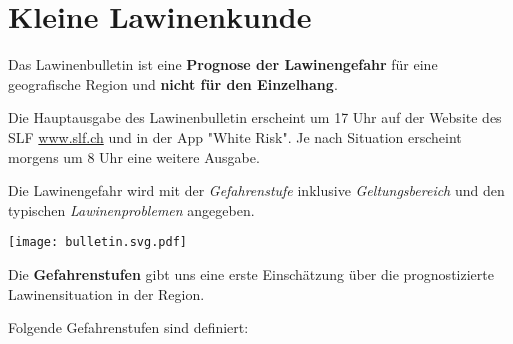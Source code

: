 \section{Kleine Lawinenkunde}

Das Lawinenbulletin ist eine \textbf{Prognose der Lawinengefahr} für eine geografische Region und \textbf{nicht für den Einzelhang}.

Die Hauptausgabe des Lawinenbulletin erscheint um 17 Uhr auf der Website des SLF \href{https://www.slf.ch}{www.slf.ch} und in der App "White Risk".
Je nach Situation erscheint morgens um 8 Uhr eine weitere Ausgabe.

Die Lawinengefahr wird mit der \textit{Gefahrenstufe} inklusive \textit{Geltungsbereich} und den typischen \textit{Lawinenproblemen} angegeben.

\begin{center}
  \texttt{[image: bulletin.svg.pdf]}
\end{center}

Die \textbf{Gefahrenstufen} gibt uns eine erste Einschätzung über die prognostizierte Lawinensituation in der Region.

\newcolumn

Folgende Gefahrenstufen sind definiert:

